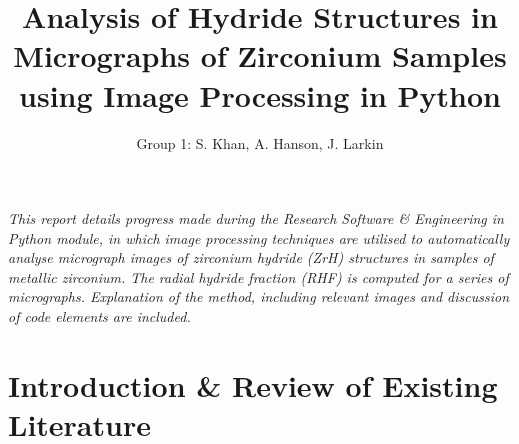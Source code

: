 \documentclass{article}
\title{Analysis of Hydride Structures in Micrographs of Zirconium Samples using Image Processing in Python}
\author{Group 1: S. Khan, A. Hanson, J. Larkin}
\begin{document}
	\maketitle
	
	\begin{center} \textit{This report details progress made during the Research Software \& Engineering in Python module, in which image processing techniques are utilised to automatically analyse micrograph images of zirconium hydride (ZrH) structures in samples of metallic zirconium. The radial hydride fraction (RHF) is computed for a series of micrographs. Explanation of the method, including relevant images and discussion of code elements are included.} \end{center}

\newpage
\tableofcontents
\newpage
	\section{Introduction \& Review of Existing Literature}
\end{document}
